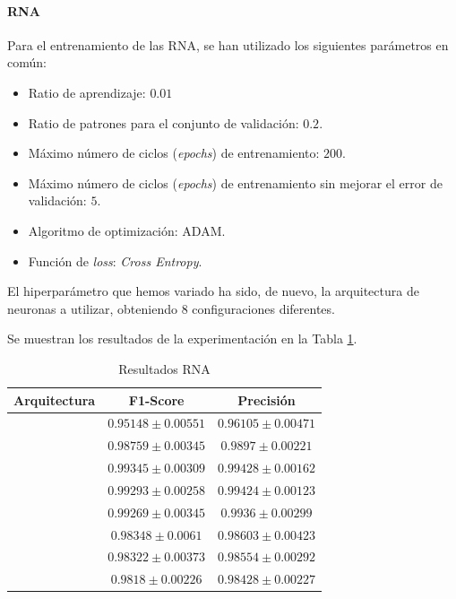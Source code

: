 \documentclass[12pt]{article}
\begin{document}
\paragraph{RNA}

Para el entrenamiento de las RNA, se han utilizado los siguientes parámetros en común:
\begin{itemize}
	\item Ratio de aprendizaje: $0.01$
	\item Ratio de patrones para el conjunto de validación: $0.2$.
	\item Máximo número de ciclos (\textit{epochs}) de entrenamiento: $200$.
	\item Máximo número de ciclos (\textit{epochs}) de entrenamiento sin mejorar el error de validación: $5$.
	\item Algoritmo de optimización: ADAM.
	\item Función de \textit{loss}: \textit{Cross Entropy}.
\end{itemize}
El hiperparámetro que hemos variado ha sido, de nuevo, la arquitectura de neuronas a utilizar, obteniendo 8 configuraciones diferentes.

Se muestran los resultados de la experimentación en la Tabla \ref{Tab:ANN_4}.

\begin{table}[!ht]
	\caption{Resultados RNA}
	\centering
		 \begin{tabular}{||c c c||}
			 \hline
			 Arquitectura & F1-Score & Precisión  \\ [0.5ex]
			 \hline\hline
			[16] & $0.95148 \pm 0.00551$ & $0.96105 \pm 0.00471$ \\
			\hline 
			[32] & $0.98759 \pm 0.00345$ & $0.9897 \pm 0.00221$ \\
			\hline 
			[64] & $0.99345 \pm 0.00309$ & $0.99428 \pm 0.00162$ \\
			\hline 
			[128] & $0.99293 \pm 0.00258$ & $0.99424 \pm 0.00123$ \\
			\hline 
			[256] & $0.99269 \pm 0.00345$ & $0.9936 \pm 0.00299$ \\
			\hline 
			[512] & $0.98348 \pm 0.0061$ & $0.98603 \pm 0.00423$ \\
			\hline 
			[64, 64] & $0.98322 \pm 0.00373$ & $0.98554 \pm 0.00292$ \\
			\hline 
			[64, 128] & $0.9818 \pm 0.00226$ & $0.98428 \pm 0.00227$ \\
			\hline 
		 \end{tabular}
	\label{Tab:ANN_4}
	\end{table}
\end{document}
